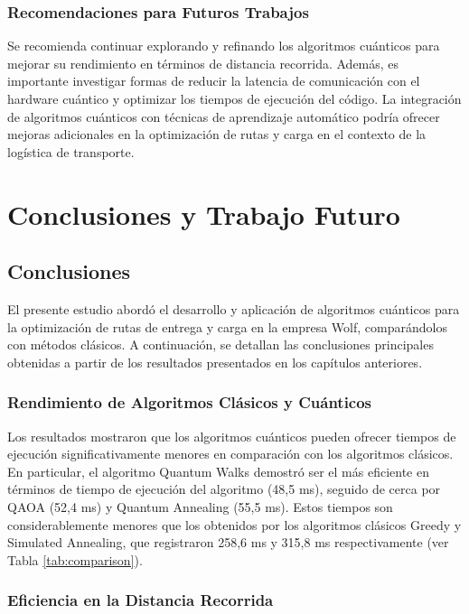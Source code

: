 \documentclass[11pt,a4paper,spanish]{book}
\begin{document}
\subsection{Recomendaciones para Futuros Trabajos}

Se recomienda continuar explorando y refinando los algoritmos cuánticos para mejorar su rendimiento en términos de distancia recorrida. Además, es importante investigar formas de reducir la latencia de comunicación con el hardware cuántico y optimizar los tiempos de ejecución del código. La integración de algoritmos cuánticos con técnicas de aprendizaje automático podría ofrecer mejoras adicionales en la optimización de rutas y carga en el contexto de la logística de transporte.




\chapter{Conclusiones y Trabajo Futuro}

\section{Conclusiones}

El presente estudio abordó el desarrollo y aplicación de algoritmos cuánticos para la optimización de rutas de entrega y carga en la empresa Wolf, comparándolos con métodos clásicos. A continuación, se detallan las conclusiones principales obtenidas a partir de los resultados presentados en los capítulos anteriores.

\subsection{Rendimiento de Algoritmos Clásicos y Cuánticos}

Los resultados mostraron que los algoritmos cuánticos pueden ofrecer tiempos de ejecución significativamente menores en comparación con los algoritmos clásicos. En particular, el algoritmo Quantum Walks demostró ser el más eficiente en términos de tiempo de ejecución del algoritmo (48,5 ms), seguido de cerca por QAOA (52,4 ms) y Quantum Annealing (55,5 ms). Estos tiempos son considerablemente menores que los obtenidos por los algoritmos clásicos Greedy y Simulated Annealing, que registraron 258,6 ms y 315,8 ms respectivamente (ver Tabla \ref{tab:comparison}).

\subsection{Eficiencia en la Distancia Recorrida}
\end{document}
